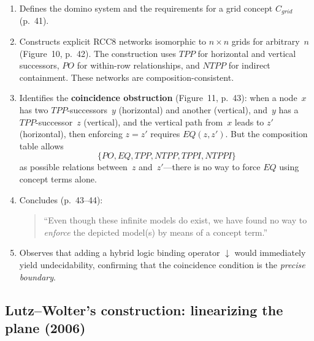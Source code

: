 \documentclass[11pt]{article}
\begin{document}
\begin{enumerate}
  \item Defines the domino system and the requirements for a grid concept
    $C_{\mathit{grid}}$ (p.~41).

  \item Constructs explicit RCC8 networks isomorphic to
    $n \times n$ grids for arbitrary~$n$ (Figure~10, p.~42).
    The construction uses $TPP$ for horizontal and vertical successors,
    $PO$ for within-row relationships, and $NTPP$ for indirect containment.
    These networks are composition-consistent.

  \item Identifies the \textbf{coincidence obstruction} (Figure~11, p.~43):
    when a node~$x$ has two $TPP$-successors~$y$ (horizontal) and another
    (vertical), and~$y$ has a $TPP$-successor~$z$ (vertical), and the
    vertical path from~$x$ leads to $z'$ (horizontal), then enforcing
    $z = z'$ requires $EQ(z,z')$.  But the composition table allows
    \[
    \{PO, EQ, TPP, NTPP, TPPI, NTPPI\}
    \]
    as possible relations between~$z$ and~$z'$---there is no way to
    force $EQ$ using concept terms alone.

  \item Concludes (p.~43--44):
    \begin{quote}
      ``Even though these infinite models do exist, we have found no way to
      \emph{enforce} the depicted model(s) by means of a concept term.''
    \end{quote}

  \item Observes that adding a hybrid logic binding operator $\downarrow$
    would immediately yield undecidability, confirming that the coincidence
    condition is the \emph{precise boundary}.
\end{enumerate}

\subsection{Lutz--Wolter's construction: linearizing the plane (2006)}
\end{document}
